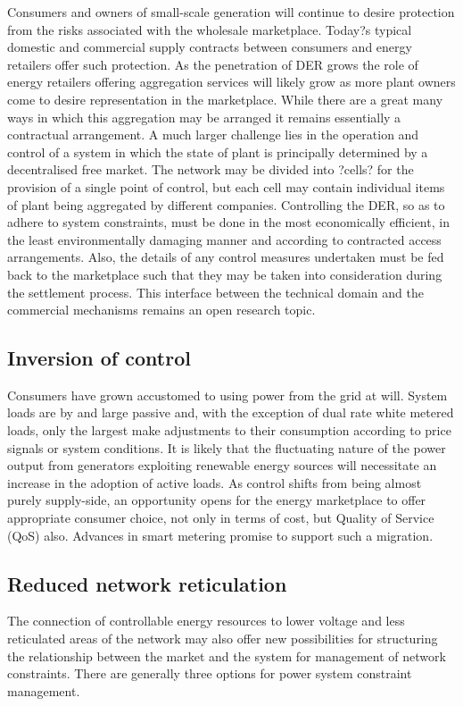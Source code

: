Consumers and owners of small-scale generation will continue to desire
protection from the risks associated with the wholesale marketplace.  Today?s
typical domestic and commercial supply contracts between consumers and energy
retailers offer such protection.  As the penetration of DER grows the role of
energy retailers offering aggregation services will likely grow as more plant
owners come to desire representation in the marketplace.  While there are a
great many ways in which this aggregation may be arranged it remains
essentially a contractual arrangement. A much larger challenge lies in the
operation and control of a system in which the state of plant is principally
determined by a decentralised free market.  The network may be divided
into ?cells? for the provision of a single point of control, but each cell may
contain individual items of plant being aggregated by different companies.
Controlling the DER, so as to adhere to system constraints, must be done in
the most economically efficient, in the least environmentally damaging manner
and according to contracted access arrangements.  Also, the details of any
control measures undertaken must be fed back to the marketplace such that they
may be taken into consideration during the settlement process.  This interface
between the technical domain and the commercial mechanisms remains an open
research topic.

\subsection{Inversion of control}
Consumers have grown accustomed to using power from the grid at will.  System
loads are by and large passive and, with the exception of dual rate white
metered loads, only the largest make adjustments to their consumption
according to price signals or system conditions.  It is likely that the
fluctuating nature of the power output from generators exploiting renewable
energy sources will necessitate an increase in the adoption of active loads.
As control shifts from being almost purely supply-side, an opportunity opens
for the energy marketplace to offer appropriate consumer choice, not only in
terms of cost, but Quality of Service (QoS) also. Advances in smart metering
promise to support such a migration.

\subsection{Reduced network reticulation}
The connection of controllable energy resources to lower voltage and less
reticulated areas of the network may also offer new possibilities for
structuring the relationship between the market and the system for management
of network constraints.  There are generally three options for power system
constraint management.

